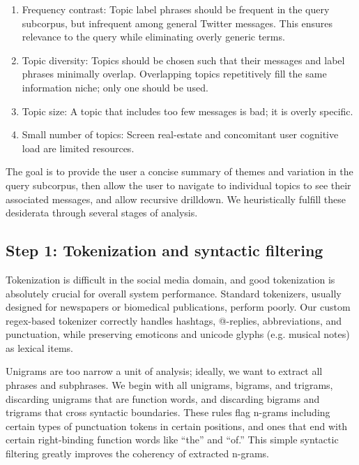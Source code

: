 \documentclass[letterpaper]{article}
\begin{document}
\begin{enumerate}
\item Frequency contrast: Topic label phrases should be frequent in the query subcorpus, but infrequent among general Twitter messages.  This ensures relevance to the query while eliminating overly generic terms.
\item Topic diversity: Topics should be chosen such that their messages and label phrases minimally overlap.  Overlapping topics repetitively fill the same information niche; only one should be used.
\item Topic size: A topic that includes too few messages is bad; it is overly specific.
\item Small number of topics: Screen real-estate and concomitant user cognitive load are limited resources.
\end{enumerate}
The goal is to provide the user a concise summary of themes and variation in the query subcorpus, then allow the user to navigate to individual topics to see their associated messages, and allow recursive drilldown.  We heuristically fulfill these desiderata through several stages of analysis.


\subsection{Step 1: Tokenization and syntactic filtering}

Tokenization is difficult in the social media domain, and good tokenization is absolutely crucial for overall system performance.  Standard tokenizers, usually designed for newspapers or biomedical publications, perform poorly.  Our custom regex-based tokenizer correctly handles hashtags, @-replies, abbreviations, and punctuation, while preserving emoticons and unicode glyphs (e.g. musical notes) as lexical items.

Unigrams are too narrow a unit of analysis; ideally, we want to extract all phrases and subphrases.  We begin with all unigrams, bigrams, and trigrams, discarding unigrams that are function words, and discarding bigrams and trigrams that cross syntactic boundaries. These rules flag n-grams including certain types of punctuation tokens in certain positions, and ones that end with certain right-binding function words like ``the'' and ``of.''  This simple syntactic filtering greatly improves the coherency of extracted n-grams.
\end{document}
